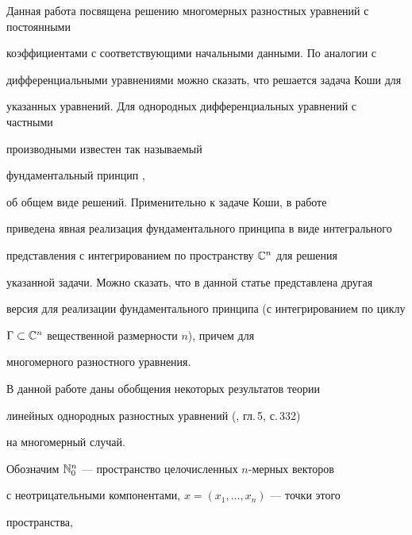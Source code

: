 

\maketitle


\label{begin}








Данная работа посвящена решению многомерных разностных уравнений с постоянными


коэффициентами с соответствующими начальными данными. По аналогии с


дифференциальными уравнениями можно сказать, что решается задача Коши для


указанных уравнений. Для однородных дифференциальных уравнений с частными


производными известен так называемый


фундаментальный принцип \cite{pal}, \cite{yger}


об общем виде решений. Применительно к задаче Коши, в работе \cite{rigate}


приведена явная реализация фундаментального принципа в виде интегрального


представления с интегрированием по пространству $\Bbb C^n$ для решения


указанной задачи. Можно сказать, что в данной статье представлена другая


версия для реализации фундаментального принципа (с интегрированием по циклу


$\Gamma\subset\Bbb C^n$ вещественной размерности $n$), причем для


многомерного разностного уравнения.





В данной работе даны обобщения некоторых результатов теории


линейных однородных разностных уравнений (\cite{gelf}, гл.\,5, с.\,332)


на многомерный случай.





Обозначим $\Bbb N^n_0$ --- пространство целочисленных $n$-мерных векторов


с неотрицательными компонентами, $x=(x_1,\dotsc, x_n)$ --- точки этого


пространства,


